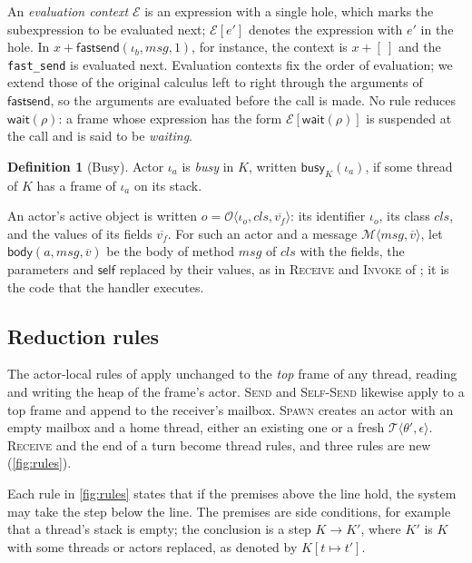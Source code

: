 \documentclass[11pt]{article}
\theoremstyle{definition}
\newtheorem{definition}[theorem]{Definition}
\theoremstyle{remark}
\newcommand{\fs}{\texttt{fast\_send}}
\newcommand{\Thr}[1]{\mathcal{T}\langle #1\rangle}
\newcommand{\Msg}[1]{\mathcal{M}\langle #1\rangle}
\newcommand{\Obj}[1]{\mathcal{O}\langle #1\rangle}
\newcommand{\ctx}[1]{\mathcal{E}[#1]}
\newcommand{\wait}[1]{\mathsf{wait}(#1)}
\newcommand{\fsend}{\mathsf{fastsend}}
\newcommand{\busy}{\mathsf{busy}}
\newcommand{\body}{\mathsf{body}}
\newcommand{\red}{\longrightarrow}
\begin{document}
An \emph{evaluation context} $\mathcal{E}$ is an expression with a single hole, which
marks the subexpression to be evaluated next; $\ctx{e'}$ denotes the expression with
$e'$ in the hole. In $x + \fsend(\iota_b, msg, 1)$, for instance, the context is
$x + [\ ]$ and the \fs{} is evaluated next. Evaluation contexts fix the order of
evaluation; we extend those of the original calculus left to right through the arguments
of $\fsend$, so the arguments are evaluated before the call is made. No rule reduces
$\wait{\rho}$: a frame whose expression has the form $\ctx{\wait{\rho}}$ is suspended at
the call and is said to be \emph{waiting}.

\begin{definition}[Busy]
Actor $\iota_a$ is \emph{busy} in $K$, written $\busy_K(\iota_a)$, if some thread of $K$
has a frame of $\iota_a$ on its stack.
\end{definition}

An actor's active object is written $o = \Obj{\iota_o, cls, \overline{v_f}}$: its
identifier $\iota_o$, its class $cls$, and the values of its fields $\overline{v_f}$. For
such an actor and a message $\Msg{msg, \overline{v}}$, let $\body(a, msg, \overline{v})$
be the body of method $msg$ of $cls$ with the fields, the parameters and $\mathsf{self}$
replaced by their values, as in \textsc{Receive} and \textsc{Invoke} of
\cite{dekoster2024}; it is the code that the handler executes.

\subsection{Reduction rules}

The actor-local rules of \cite{dekoster2024} apply unchanged to the \emph{top} frame of
any thread, reading and writing the heap of the frame's actor. \textsc{Send} and
\textsc{Self-Send} likewise apply to a top frame and append to the receiver's mailbox.
\textsc{Spawn} creates an actor with an empty mailbox and a home thread, either an
existing one or a fresh $\Thr{\theta', \epsilon}$. \textsc{Receive} and the end of a turn
become thread rules, and three rules are new (\cref{fig:rules}).

Each rule in \cref{fig:rules} states that if the premises above the line hold, the
system may take the step below the line. The premises are side conditions, for example
that a thread's stack is empty; the conclusion is a step $K \red K'$, where $K'$ is $K$
with some threads or actors replaced, as denoted by $K[t \mapsto t']$.
\end{document}
